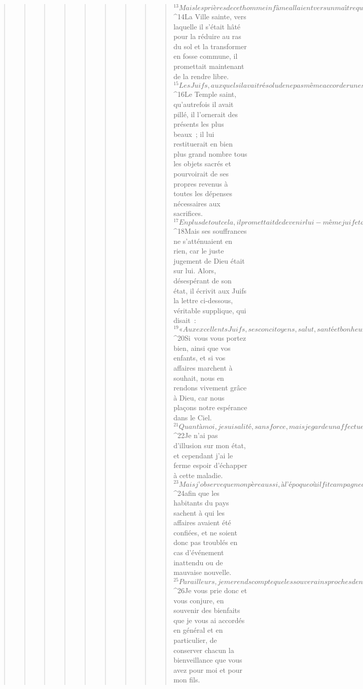 \begin{verse}
\begin{verse}
\begin{verse}
\begin{verse}
\begin{verse}
\begin{verse}
\begin{verse}
\begin{verse}
\begin{verse}
${}^{13}Mais les prières de cet homme infâme allaient vers un maître qui ne devait plus avoir pitié de lui. 
${}^{14}La Ville sainte, vers laquelle il s’était hâté pour la réduire au ras du sol et la transformer en fosse commune, il promettait maintenant de la rendre libre. 
${}^{15}Les Juifs, auxquels il avait résolu de ne pas même accorder une sépulture, et qu’il avait décidé de jeter avec leurs petits enfants aux bêtes sauvages et en pâture aux oiseaux de proie, il disait maintenant vouloir les rendre tous égaux aux Athéniens. 
${}^{16}Le Temple saint, qu’autrefois il avait pillé, il l’ornerait des présents les plus beaux ; il lui restituerait en bien plus grand nombre tous les objets sacrés et pourvoirait de ses propres revenus à toutes les dépenses nécessaires aux sacrifices. 
${}^{17}En plus de tout cela, il promettait de devenir lui-même juif et de parcourir tout lieu habité en proclamant la souveraineté de Dieu. 
${}^{18}Mais ses souffrances ne s’atténuaient en rien, car le juste jugement de Dieu était sur lui. Alors, désespérant de son état, il écrivit aux Juifs la lettre ci-dessous, véritable supplique, qui disait :
${}^{19}« Aux excellents Juifs, ses concitoyens, salut, santé et bonheur parfaits de la part d’Antiocos, roi et général en chef. 
${}^{20}Si vous vous portez bien, ainsi que vos enfants, et si vos affaires marchent à souhait, nous en rendons vivement grâce à Dieu, car nous plaçons notre espérance dans le Ciel. 
${}^{21}Quant à moi, je suis alité, sans force, mais je garde un affectueux souvenir de votre respect et de votre bienveillance. À mon retour des régions de Perse, je suis tombé gravement malade, et j’ai donc estimé nécessaire de veiller à la sécurité de tous. 
${}^{22}Je n’ai pas d’illusion sur mon état, et cependant j’ai le ferme espoir d’échapper à cette maladie. 
${}^{23}Mais j’observe que mon père aussi, à l’époque où il fit campagne dans le haut pays, désigna son successeur, 
${}^{24}afin que les habitants du pays sachent à qui les affaires avaient été confiées, et ne soient donc pas troublés en cas d’événement inattendu ou de mauvaise nouvelle. 
${}^{25}Par ailleurs, je me rends compte que les souverains proches de nous et les voisins du royaume épient les occasions et guettent la suite des événements. C’est pourquoi j’ai désigné comme roi mon fils Antiocos, que j’avais souvent confié et recommandé à la plupart d’entre vous, lorsque je me hâtais vers les provinces du haut pays. Je lui ai d’ailleurs écrit la lettre transcrite ci-dessous. 
${}^{26}Je vous prie donc et vous conjure, en souvenir des bienfaits que je vous ai accordés en général et en particulier, de conserver chacun la bienveillance que vous avez pour moi et pour mon fils. 

\end{verse}
\end{verse}
\end{verse}
\end{verse}
\end{verse}
\end{verse}
\end{verse}
\end{verse}
\end{verse}
